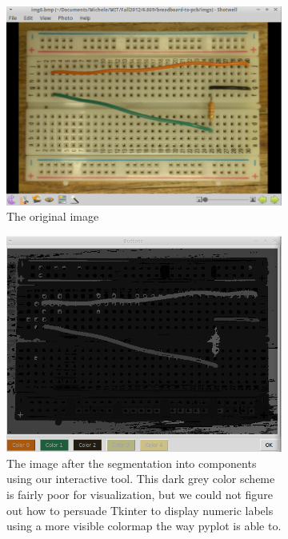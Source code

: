 \documentclass[10pt,twocolumn,letterpaper]{article}
\begin{document}
\begin{figure}[ht]
\centering
\begin{subfigure}[b]{\linewidth}
	\centering
   \includegraphics[width=0.9\linewidth]{demos/full_pipeline2_original.png}
	\caption{The original image}
	\label{fig:origfull}
\end{subfigure}
\begin{subfigure}[b]{\linewidth}
	\centering
   \includegraphics[width=0.9\linewidth]{demos/full_pipeline2_segmentation.png}
	\caption{The image after the segmentation into components using
      our interactive tool. This dark grey color scheme is fairly poor
    for visualization, but we could not figure out how to persuade
    Tkinter to display numeric labels using a more visible colormap
    the way pyplot is able to.}
	\label{fig:segfull}
\end{subfigure}
\begin{subfigure}[b]{\linewidth}

\end{subfigure}
\end{figure}
\end{document}
